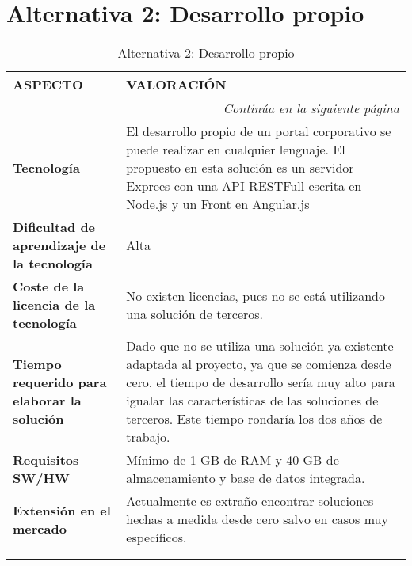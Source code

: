 \section{Alternativa 2: Desarrollo propio}

\begin{center}
\begin{longtable}{p{4cm} p{8cm}}

\textbf{ASPECTO} & \textbf{VALORACIÓN} \\ \hline \hline
\endfirsthead
\endhead

\multicolumn{2}{r}{\textit{Continúa en la siguiente página}} \\
\endfoot
\endlastfoot

\textbf{Tecnología} & El desarrollo propio de un portal corporativo se puede realizar en cualquier lenguaje. El propuesto en esta solución es un servidor Exprees con una API RESTFull escrita en Node.js y un Front en Angular.js\\ \hline

\textbf{Dificultad de aprendizaje de la tecnología} & Alta\\ \hline

\textbf{Coste de la licencia de la tecnología} &
\par No existen licencias, pues no se está utilizando una solución de terceros.
\\ \hline

\textbf{Tiempo requerido para elaborar la solución} & Dado que no se utiliza una solución ya existente adaptada al proyecto, ya que se comienza desde cero, el tiempo de desarrollo sería muy alto para igualar las características de las soluciones de terceros. Este tiempo rondaría los dos años de trabajo.\\ \hline

\textbf{Requisitos SW/HW} & Mínimo de 1 GB de RAM y 40 GB de almacenamiento y base de datos integrada.\\ \hline

\textbf{Extensión en el mercado} & Actualmente es extraño encontrar soluciones hechas a medida desde cero salvo en casos muy específicos.\\ \hline \hline


\caption{Alternativa 2: Desarrollo propio}\\
\label{tab:alternative2}
\end{longtable}
\end{center}
